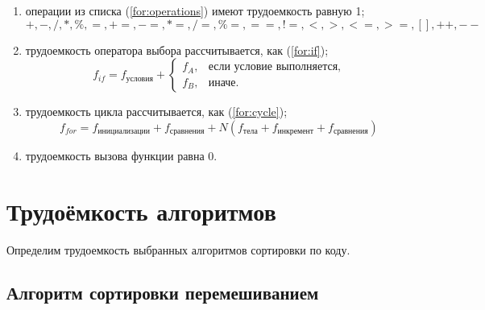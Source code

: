 \begin{enumerate}
	\item операции из списка (\ref{for:operations}) имеют трудоемкость равную 1;
	\begin{equation}
		\label{for:operations}
		+, -, /, *, \%, =, +=, -=, *=, /=, \%=, ==, !=, <, >, <=, >=, [], ++, {-}-
	\end{equation}
	\item трудоемкость оператора выбора  рассчитывается, как (\ref{for:if});
	\begin{equation}
		\label{for:if}
		f_{if} = f_{\text{условия}} +
		\begin{cases}
			f_A, & \text{если условие выполняется,}\\
			f_B, & \text{иначе.}
		\end{cases}
	\end{equation}
	\item трудоемкость цикла рассчитывается, как (\ref{for:cycle});
	\begin{equation}
		\label{for:cycle}
		f_{for} = f_{\text{инициализации}} + f_{\text{сравнения}} + N(f_{\text{тела}} + f_{\text{инкремент}} + f_{\text{сравнения}})
	\end{equation}
	\item трудоемкость вызова функции равна 0.
\end{enumerate}


\section{Трудоёмкость алгоритмов}

Определим трудоемкость выбранных алгоритмов сортировки по коду.

\subsection{Алгоритм сортировки перемешиванием}

